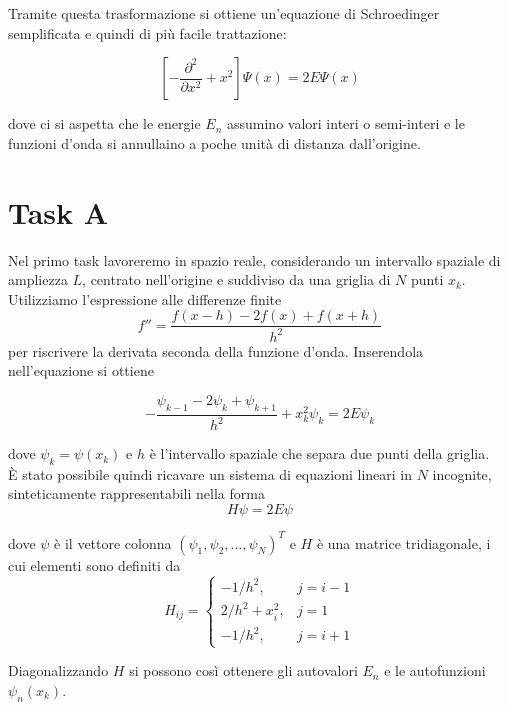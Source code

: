 \documentclass[a4paper,11pt]{article}
\begin{document}
Tramite questa trasformazione si ottiene un'equazione di Schroedinger semplificata e quindi di più facile trattazione:

\begin{equation}
\left[ - \frac{\partial^2}{\partial x^2} + x^2 \right] \Psi(x) = 2E \Psi(x)
\end{equation}

dove ci si aspetta che le energie $E_n$ assumino valori interi o semi-interi e le funzioni d'onda si annullaino a poche unità di distanza dall'origine.

\section*{Task A}

Nel primo task lavoreremo in spazio reale, considerando un intervallo spaziale di ampliezza $L$, centrato nell'origine e suddiviso da una griglia di $N$ punti $x_k$. \\
Utilizziamo l'espressione alle differenze finite 
\begin{equation}
f'' = \frac{f(x-h) - 2f(x) + f(x + h)}{h^2}
\end{equation}
per riscrivere la derivata seconda della funzione d'onda. Inserendola nell'equazione si ottiene

\begin{equation}
- \frac{\psi_{k-1} - 2\psi_k + \psi_{k+1}}{h^2} + x^2_k \psi_k = 2E\psi_k
\end{equation}

dove $\psi_k = \psi(x_k)$ e $h$ è l'intervallo spaziale che separa due punti della griglia. \\
È stato possibile quindi ricavare un sistema di equazioni lineari in $N$ incognite, sinteticamente rappresentabili nella forma
\begin{equation}
H\psi = 2E\psi
\end{equation}

dove $\psi$ è il vettore colonna $(\psi_1, \psi_2, ..., \psi_N)^T$ e $H$ è una matrice tridiagonale, i cui elementi sono definiti da
\begin{equation}
H_{ij} = \left\{
\begin{array}{lr} 
-1/h^2,  & j = i - 1 \\
2/h^2 + x_i^2, & j = 1 \\
-1/h^2, & j = i + 1
\end{array}
\right.
\end{equation}

Diagonalizzando $H$ si possono così ottenere gli autovalori $E_n$ e le autofunzioni $\psi_n(x_k)$.
\end{document}
